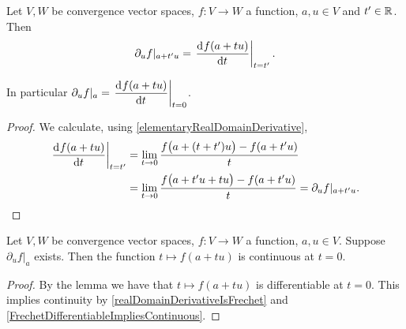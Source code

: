 \begin{lemma} \label{directionalDerivativeAsOD}
Let $V,W$ be convergence vector spaces, $f: V\to W$ a function, $a,u\in V$ and $t'\in \mathbb{R}$. Then
\[ \partial_u f|_{a+t'u} = \left.\mathinner{ \dfrac{\operatorname{d \!}{^{}}f(a+tu)}{\operatorname{d \!}{{t}^{}}} }\right|_{t=t'}. \]
\end{lemma}
In particular $\partial_u f|_a = \left.\mathinner{ \dfrac{\operatorname{d \!}{^{}}f(a+tu)}{\operatorname{d \!}{{t}^{}}} }\right|_{t=0}$.
\begin{proof}
We calculate, using \ref{elementaryRealDomainDerivative},
\begin{align*}
\left.\mathinner{ \dfrac{\operatorname{d \!}{^{}}f(a+tu)}{\operatorname{d \!}{{t}^{}}} }\right|_{t=t'} &= \lim_{t\to 0}\frac{f\big(a+(t+t')u\big) - f(a+t'u)}{t} \\
&= \lim_{t\to 0}\frac{f\big(a+t'u + tu \big) - f(a+t'u)}{t} = \partial_uf|_{a+t'u}.
\end{align*}
\end{proof}
\begin{corollary} \label{partialDerivativeImpliesContinuityAlongLine}
Let $V,W$ be convergence vector spaces, $f: V\to W$ a function, $a,u\in V$. Suppose $\partial_uf|_a$ exists. Then the function $t\mapsto f(a+tu)$ is continuous at $t=0$.
\end{corollary}
\begin{proof}
By the lemma we have that $t\mapsto f(a+tu)$ is differentiable at $t=0$. This implies continuity by \ref{realDomainDerivativeIsFrechet} and \ref{FrechetDifferentiableImpliesContinuous}.
\end{proof}







